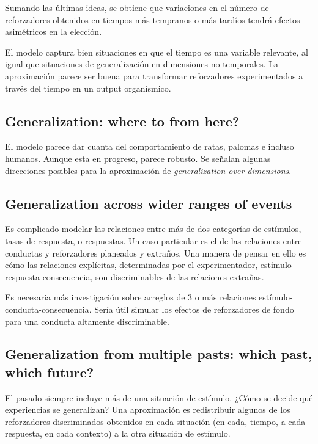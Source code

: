 \documentclass[a4paper,12pt]{article}
\begin{document}
Sumando las últimas ideas, se obtiene que variaciones en el número de reforzadores obtenidos en tiempos más tempranos o más tardíos tendrá efectos asimétricos en la elección.

El modelo captura bien situaciones en que el tiempo es una variable relevante, al igual que situaciones de generalización en dimensiones no-temporales. La aproximación parece ser buena para transformar reforzadores experimentados a través del tiempo en un output organísmico.

\subsection{Generalization: where to from here?}

El modelo parece dar cuanta del comportamiento de ratas, palomas e incluso humanos. Aunque esta en progreso, parece robusto. Se señalan algunas direcciones posibles para la aproximación de {\itshape generalization-over-dimensions}.

\subsection{Generalization across wider ranges of events}

Es complicado modelar las relaciones entre más de dos categorías de estímulos, tasas de respuesta, o respuestas. Un caso particular es el de las relaciones entre conductas y reforzadores planeados y extraños. Una manera de pensar en ello es cómo las relaciones explícitas, determinadas por el experimentador, estímulo-respuesta-consecuencia, son discriminables de las relaciones extrañas.

Es necesaria más investigación sobre arreglos de 3 o más relaciones estímulo-conducta-consecuencia. Sería útil simular los efectos de reforzadores de fondo para una conducta altamente discriminable.

\subsection{Generalization from multiple pasts: which past, which future?}

El pasado siempre incluye más de una situación de estímulo. ¿Cómo se decide qué experiencias se generalizan? Una aproximación es redistribuir algunos de los reforzadores discriminados obtenidos en cada situación (en cada, tiempo, a cada respuesta, en cada contexto) a la otra situación de estímulo.
\end{document}
